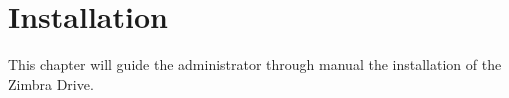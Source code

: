 \chapter{Installation}\label{==cha:installation==}

This chapter will guide the administrator through manual the installation of the Zimbra Drive.



